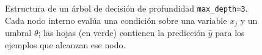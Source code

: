 \begin{figure}[H]
{}%
\caption{Estructura de un árbol de decisión de profundidad \texttt{max\_depth=3}. Cada nodo interno evalúa una condición sobre una variable $x_j$ y un umbral $\theta$; las hojas (en verde) contienen la predicción $\hat{y}$ para los ejemplos que alcanzan ese nodo.}
\label{fig:decision_tree}
\end{figure}